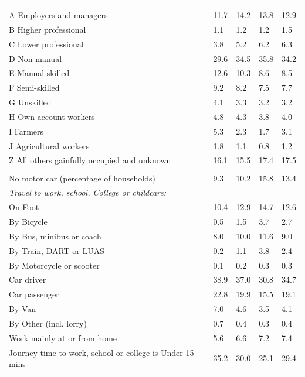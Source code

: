 \documentclass{article}
\begin{document}
\begin{table}[h]
\begin{tabular}{KTTTT}
\hline
    \\ 
    \hline
A Employers and managers & 11.7& 14.2& 13.8& 12.9\\
B Higher professional & 1.1& 1.2& 1.2& 1.5\\
C Lower professional & 3.8& 5.2& 6.2& 6.3\\
D Non-manual & 29.6& 34.5& 35.8& 34.2\\
E Manual skilled & 12.6& 10.3&  8.6&  8.5\\
F Semi-skilled & 9.2& 8.2& 7.5& 7.7\\
G Unskilled & 4.1& 3.3& 3.2& 3.2\\
H Own account workers & 4.8& 4.3& 3.8& 4.0\\
I Farmers & 5.3& 2.3& 1.7& 3.1\\
J Agricultural workers & 1.8& 1.1& 0.8& 1.2\\
Z All others gainfully occupied and unknown & 16.1& 15.5& 17.4& 17.5\\
\hline
{}\hline
    \\ 
    \hline
No motor car (percentage of households) &  9.3& 10.2& 15.8& 
13.4\\
    \hline 
\emph{Travel to work, school, College or childcare:} & & & \\
\quad On Foot & 10.4& 12.9& 14.7& 12.6\\ 
\quad By Bicycle & 0.5& 1.5& 3.7& 2.7\\ 
\quad By Bus, minibus or coach &  8.0& 10.0& 11.6&  9.0\\
\quad By Train, DART or LUAS & 0.2& 1.1& 3.8& 2.4\\
\quad By Motorcycle or scooter & 0.1& 0.2& 0.3& 0.3\\
\quad Car driver & 38.9 & 37.0& 30.8& 34.7\\
\quad Car passenger & 22.8& 19.9& 15.5& 19.1\\
\quad By Van & 7.0& 4.6& 3.5& 4.1\\
\quad By Other (incl. lorry) & 0.7& 0.4& 0.3& 0.4\\
    \hline
Work mainly at or from home & 5.6& 6.6& 7.2& 7.4\\
Journey time to work, school or college is Under 15 mins & 35.2& 30.0& 25.1& 29.4\\

\end{tabular}
\end{table}
\end{document}
